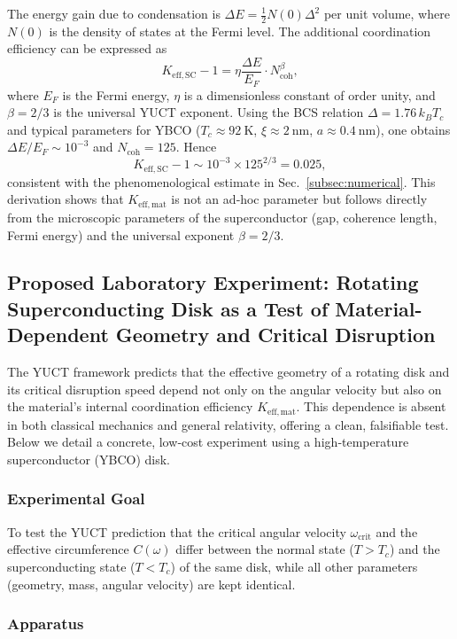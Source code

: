 \documentclass[12pt,a4paper]{article}
\begin{document}
	The energy gain due to condensation is \(\Delta E = \frac{1}{2} N(0) \Delta^2\) per unit volume, where \(N(0)\) is the density of states at the Fermi level. The additional coordination efficiency can be expressed as
	\[
	K_{\mathrm{eff,SC}} - 1 = \eta \frac{\Delta E}{E_F} \cdot N_{\text{coh}}^{\beta},
	\]
	where \(E_F\) is the Fermi energy, \(\eta\) is a dimensionless constant of order unity, and \(\beta = 2/3\) is the universal YUCT exponent. Using the BCS relation \(\Delta = 1.76 \, k_B T_c\) and typical parameters for YBCO (\(T_c \approx 92\ \text{K}\), \(\xi \approx 2\ \text{nm}\), \(a \approx 0.4\ \text{nm}\)), one obtains \(\Delta E/E_F \sim 10^{-3}\) and \(N_{\text{coh}} = 125\). Hence
	\[
	K_{\mathrm{eff,SC}} - 1 \sim 10^{-3} \times 125^{2/3} = 0.025,
	\]
	consistent with the phenomenological estimate in Sec.~\ref{subsec:numerical}. This derivation shows that \(K_{\mathrm{eff,mat}}\) is not an ad‑hoc parameter but follows directly from the microscopic parameters of the superconductor (gap, coherence length, Fermi energy) and the universal exponent \(\beta = 2/3\).
	
	
\subsection{Proposed Laboratory Experiment: Rotating Superconducting Disk as a Test of Material-Dependent Geometry and Critical Disruption}

The YUCT framework predicts that the effective geometry of a rotating disk and its critical disruption speed depend not only on the angular velocity but also on the material's internal coordination efficiency \(K_{\mathrm{eff,mat}}\). This dependence is absent in both classical mechanics and general relativity, offering a clean, falsifiable test. Below we detail a concrete, low‑cost experiment using a high‑temperature superconductor (YBCO) disk.

\subsubsection{Experimental Goal}

To test the YUCT prediction that the critical angular velocity \(\omega_{\text{crit}}\) and the effective circumference \(C(\omega)\) differ between the normal state (\(T > T_c\)) and the superconducting state (\(T < T_c\)) of the same disk, while all other parameters (geometry, mass, angular velocity) are kept identical.

\subsubsection{Apparatus}
\end{document}
